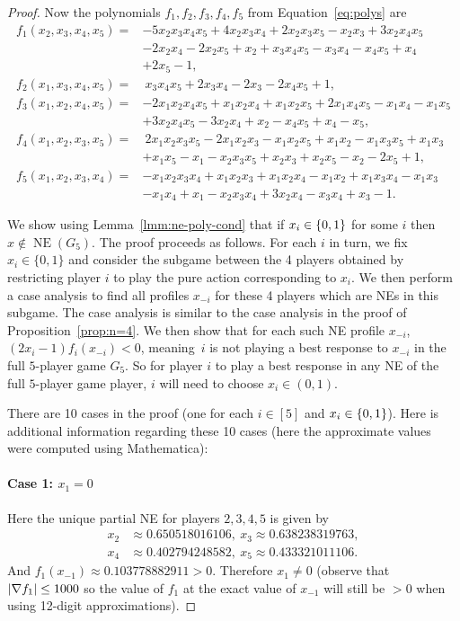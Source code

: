 \documentclass[preprint,12pt,authoryear]{elsarticle}
\DeclarePairedDelimiter{\ios}{\{}{\}}
\DeclarePairedDelimiter{\absolute}{|}{|}
\newcommand{\s}{\ios*}
\newcommand{\abs}{\absolute*}
\DeclareMathOperator{\NE}{NE}
\begin{document}
\begin{proof}
  Now the polynomials $f_1,f_2,f_3,f_4,f_5$ from Equation~\ref{eq:polys} are
  \begin{align*}
    f_1(x_2,x_3,x_4,x_5)=&-5x_2x_3x_4x_5+4x_2x_3x_4+2x_2x_3x_5-x_2x_3+3x_2x_4x_5\\
    &-2x_2x_4-2x_2x_5+x_2+x_3x_4x_5-x_3x_4-x_4x_5+x_4\\
    &+2x_5-1,\\
    f_2(x_1,x_3,x_4,x_5)=&~x_3x_4x_5+2x_3x_4-2x_3-2x_4x_5+1,\\
    f_3(x_1,x_2,x_4,x_5)=&-2x_1x_2x_4x_5+x_1x_2x_4+x_1x_2x_5+2x_1x_4x_5-x_1x_4-x_1x_5\\
    &+3x_2x_4x_5-3x_2x_4+x_2-x_4x_5+x_4-x_5,\\
    f_4(x_1,x_2,x_3,x_5)=&~2x_1x_2x_3x_5-2x_1x_2x_3-x_1x_2x_5+x_1x_2-x_1x_3x_5+x_1x_3\\
    &+x_1x_5-x_1-x_2x_3x_5+x_2x_3+x_2x_5-x_2-2x_5+1,\\
    f_5(x_1,x_2,x_3,x_4)=&-x_1x_2x_3x_4+x_1x_2x_3+x_1x_2x_4-x_1x_2+x_1x_3x_4-x_1x_3\\
    &-x_1x_4+x_1-x_2x_3x_4+3x_2x_4-x_3x_4+x_3-1.
  \end{align*}

  We show using Lemma~\ref{lmm:ne-poly-cond} that if $x_i\in\s{0,1}$ for some $i$ then 
  $x\notin\NE(G_5)$. The proof proceeds as follows. For each $i$ in turn, we fix $x_i \in \{ 0, 1 \}$ and consider the subgame between the 4 players obtained by restricting player $i$ to play the pure action corresponding to $x_i$. We then perform a case analysis to find all profiles $x_{-i}$ for these 4 players which are NEs in this subgame. The case analysis is similar to the case analysis in the proof of Proposition~\ref{prop:n=4}. We then show that for each such NE profile $x_{-i}$, $(2x_i-1)f_i(x_{-i})<0$, meaning~$i$ is not playing a best response to $x_{-i}$ in the full $5$-player game $G_5$. So for player $i$ to play a best response in any NE of the full $5$-player game player, $i$ will need to choose $x_i\in(0,1)$.
  
  There are 10 cases in the proof (one for each $i\in[5]$ and $x_i\in\s{0,1}$). Here is additional information regarding these 10 cases (here the approximate values
  were computed using Mathematica):


  \paragraph{Case 1: $x_1=0$} Here the unique partial NE for players $2,3,4,5$ is given by
  \begin{align*}
    x_2&\approx0.650518016106,~x_3\approx0.638238319763,\\
    x_4&\approx0.402794248582,~x_5\approx0.433321011106.
  \end{align*}
  And $f_1(x_{-1})\approx0.103778882911>0$. Therefore $x_1\ne0$ (observe that $\abs{\nabla 
  f_1}\le1000$ so the value of $f_1$ at the exact value of $x_{-1}$ will still be $>0$ when 
  using 12-digit approximations).


\end{proof}
\end{document}
